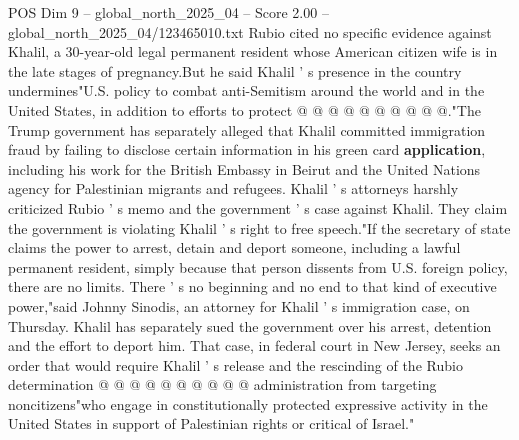 \begin{textsample}{POS Dim 9 – global\_north\_2025\_04 – Score 2.00 – global\_north\_2025\_04/123465010.txt}
Rubio cited no specific evidence against Khalil, a 30-year-old legal permanent resident whose American citizen wife is in the late stages of pregnancy.But he said Khalil ' s presence in the country undermines"U.S. policy to combat anti-Semitism around the world and in the United States, in addition to efforts to protect @ @ @ @ @ @ @ @ @ @."The Trump government has separately alleged that Khalil committed immigration fraud by failing to disclose certain information in his green card \textbf{application}, including his work for the British Embassy in Beirut and the United Nations agency for Palestinian migrants and refugees.
Khalil ' s attorneys harshly criticized Rubio ' s memo and the government ' s case against Khalil.
They claim the government is violating Khalil ' s right to free speech."If the secretary of state claims the power to arrest, detain and deport someone, including a lawful permanent resident, simply because that person dissents from U.S. foreign policy, there are no limits.
There ' s no beginning and no end to that kind of executive power,"said Johnny Sinodis, an attorney for Khalil ' s immigration case, on Thursday.
Khalil has separately sued the government over his arrest, detention and the effort to deport him.
That case, in federal court in New Jersey, seeks an order that would require Khalil ' s release and the rescinding of the Rubio determination @ @ @ @ @ @ @ @ @ @ administration from targeting noncitizens"who engage in constitutionally protected expressive activity in the United States in support of Palestinian rights or critical of Israel."

\end{textsample}
